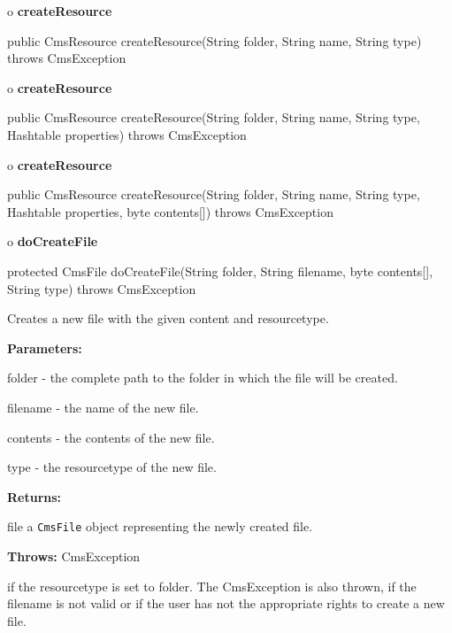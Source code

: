 o {\bf createResource}

\begin{PRE}
 public CmsResource createResource(String folder,
                                   String name,
                                   String type) throws CmsException
\end{PRE}

o {\bf createResource}

\begin{PRE}
 public CmsResource createResource(String folder,
                                   String name,
                                   String type,
                                   Hashtable properties) throws CmsException
\end{PRE}

o {\bf createResource}

\begin{PRE}
 public CmsResource createResource(String folder,
                                   String name,
                                   String type,
                                   Hashtable properties,
                                   byte contents[]) throws CmsException
\end{PRE}

o {\bf doCreateFile}

\begin{PRE}
 protected CmsFile doCreateFile(String folder,
                                String filename,
                                byte contents[],
                                String type) throws CmsException
\end{PRE}

\begin{description}
\htmlDD Creates a new file with the given content and resourcetype.\htmlBR

\begin{description}
\item {\bf Parameters:}

folder - the complete path to the folder in which the file will be created.

filename - the name of the new file.

contents - the contents of the new file.

type - the resourcetype of the new file.
\item {\bf Returns:}

file a {\tt CmsFile} object representing the newly created file.
\item {\bf Throws:} CmsException

if the resourcetype is set to folder. The CmsException is also thrown, if the
filename is not valid or if the user has not the appropriate rights to create
a new file.
\end{description}

\end{description}

